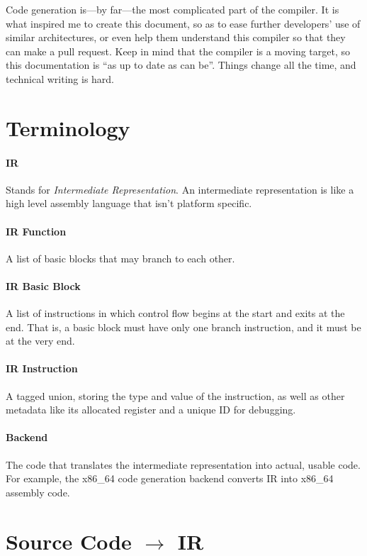 \documentclass[
12pt,
letterpaper,
oneside,
]{memoir}
\begin{document}
Code generation is---by far---the most complicated part of the compiler. It is what inspired me to create this document, so as to ease further developers' use of similar architectures, or even help them understand this compiler so that they can make a pull request. Keep in mind that the compiler is a moving target, so this documentation is ``as up to date as can be''. Things change all the time, and technical writing is hard.

\section{Terminology}

\paragraph{IR} Stands for \emph{Intermediate Representation}. An intermediate representation is like a high level assembly language that isn't platform specific.

\paragraph{IR Function} A list of basic blocks that may branch to each other.

\paragraph{IR Basic Block} A list of instructions in which control flow begins at the start and exits at the end. That is, a basic block must have only one branch instruction, and it must be at the very end.

\paragraph{IR Instruction} A tagged union, storing the type and value of the instruction, as well as other metadata like its allocated register and a unique ID for debugging.

\paragraph{Backend} The code that translates the intermediate representation into actual, usable code. For example, the x86\_64 code generation backend converts IR into x86\_64 assembly code.

\section{Source Code $\rightarrow$ IR}
\end{document}
